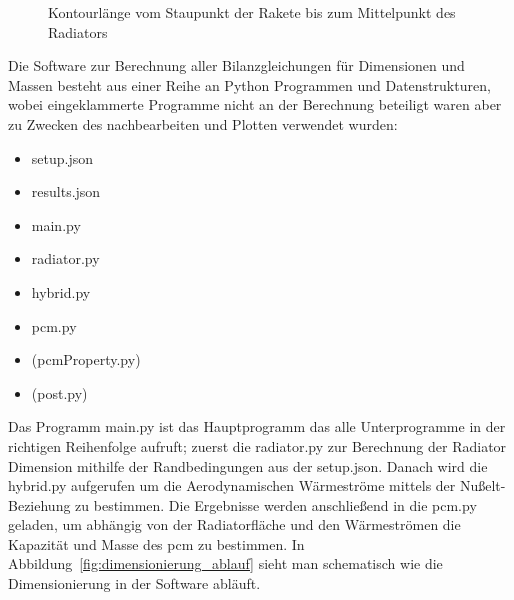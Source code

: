 \begin{figure}
  \centering
  \caption{Kontourlänge vom Staupunkt der Rakete bis zum Mittelpunkt des Radiators}\label{fig:rakete_kontour_zeichnung}
\end{figure}


Die Software zur Berechnung aller Bilanzgleichungen für Dimensionen und Massen besteht aus einer Reihe an Python Programmen und Datenstrukturen, wobei
eingeklammerte Programme nicht an der Berechnung beteiligt waren aber zu Zwecken des nachbearbeiten und Plotten verwendet wurden:
\begin{itemize}
  \item setup.json
  \item results.json
  \item main.py
  \item radiator.py
  \item hybrid.py
  \item pcm.py
  \item (pcmProperty.py)
  \item (post.py)
\end{itemize}
Das Programm main.py ist das Hauptprogramm das alle Unterprogramme in der richtigen Reihenfolge aufruft; zuerst die radiator.py zur Berechnung
der Radiator Dimension mithilfe der Randbedingungen aus der setup.json. Danach wird die hybrid.py aufgerufen um die Aerodynamischen Wärmeströme
mittels der Nußelt-Beziehung zu bestimmen. Die Ergebnisse werden anschließend in die pcm.py geladen, um abhängig von der Radiatorfläche
und den Wärmeströmen die Kapazität und Masse des \ac{pcm} zu bestimmen.
In Abbildung~\ref{fig:dimensionierung_ablauf} sieht man schematisch wie die Dimensionierung in der Software abläuft.

